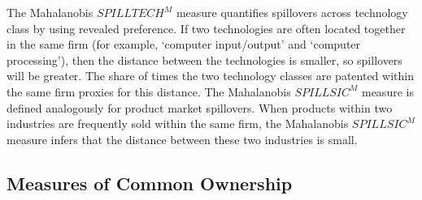 \documentclass[12pt]{article}
\begin{document}
The Mahalanobis $\mathit{SPILLTECH}^{M}$ measure quantifies spillovers across technology class by using revealed preference. If two technologies are often located together in the same firm (for example, `computer input/output' and `computer processing'), then the distance between the technologies is smaller, so spillovers will be greater. The share of times the two technology classes are patented within the same firm proxies for this distance. The Mahalanobis $\mathit{SPILLSIC}^{M}$ measure is defined analogously for product market spillovers. When products within two industries are frequently sold within the same firm, the Mahalanobis $\mathit{SPILLSIC}^{M}$ measure infers that the distance between these two industries is small.


\subsection{Measures of Common Ownership} 
\end{document}
